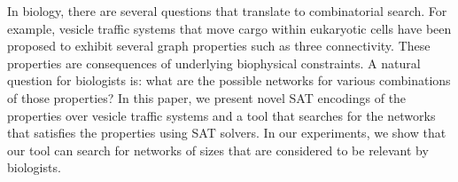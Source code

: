 In biology, there are several questions that translate to combinatorial
search. For example, vesicle traffic systems that move cargo within
eukaryotic cells have been proposed to exhibit several graph properties
such as three connectivity. These properties are consequences of underlying
biophysical constraints. A natural question for biologists is: what are the
possible networks for various combinations of those properties? In this
paper, we present novel SAT encodings of the properties over vesicle traffic
systems and a tool that searches for the networks that satisfies the
properties using SAT solvers. In our experiments, we show that our tool
can search for networks of sizes that are considered to be relevant by
biologists.



